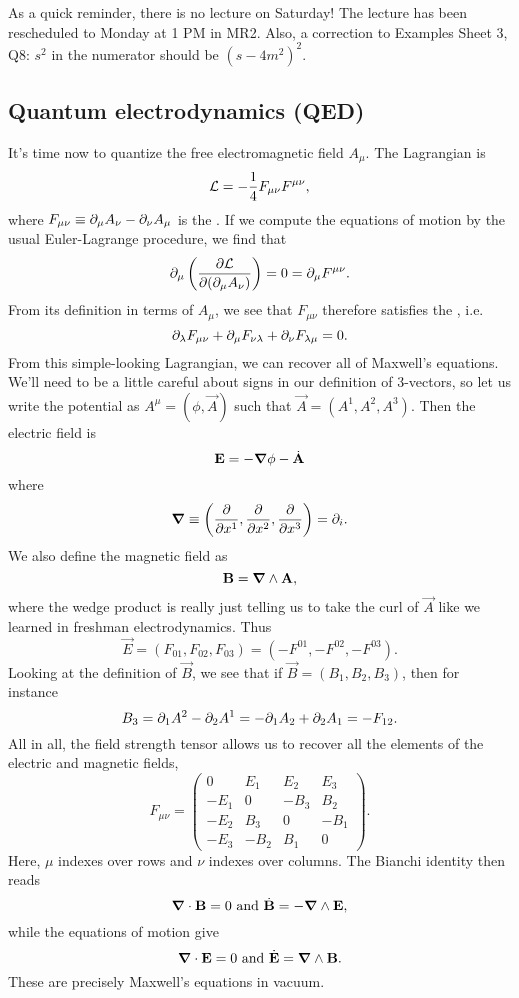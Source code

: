 As a quick reminder, there is no lecture on Saturday! The lecture has been rescheduled to Monday at 1 PM in MR2. Also, a correction to Examples Sheet 3, Q8: $s^2$ in the numerator should be $(s-4m^2)^2$.

\subsection*{Quantum electrodynamics (QED)} It's time now to quantize the free electromagnetic field $A_\mu$. The Lagrangian is
\begin{equation}
\mathcal L=-\frac{1}{4}F_{\mu\nu}F^{\mu\nu},
\end{equation}
where $F_{\mu\nu}\equiv \partial_\mu A_\nu -\partial_\nu A_\mu$ is the . If we compute the equations of motion by the usual Euler-Lagrange procedure, we find that
$$\partial_\mu\left(\frac{\partial \mathcal L}{\partial (\partial_\mu A_\nu)}\right)=0=\partial_\mu F^{\mu\nu}.$$
From its definition in terms of $A_\mu$, we see that $F_{\mu\nu}$ therefore satisfies the , i.e.
\begin{equation}
    \partial_\lambda F_{\mu\nu}+\partial_\mu F_{\nu\lambda}+\partial_\nu F_{\lambda\mu}=0.
\end{equation}
From this simple-looking Lagrangian, we can recover all of Maxwell's equations. We'll need to be a little careful about signs in our definition of 3-vectors, so let us write the potential as
$A^\mu=(\phi,\vec A)$ such that $\vec A=(A^1,A^2,A^3).$
Then the electric field is
$$\boldsymbol{\mathbf{E}}=-\mbox{\boldmath$ \nabla $} \phi - \dot {\boldsymbol{\mathbf{A}}}$$
where $$\mbox{\boldmath$ \nabla $} \equiv\left(\frac{\partial }{\partial x^1},\frac{\partial }{\partial x^2},\frac{\partial }{\partial x^3}\right)=\partial_i.$$
We also define the magnetic field as
$$\boldsymbol{\mathbf{B}}= \mbox{\boldmath$ \nabla $} \wedge \boldsymbol{\mathbf{A}},$$
where the wedge product is really just telling us to take the curl of $\vec A$ like we learned in freshman electrodynamics.
Thus
$$\vec E=(F_{01},F_{02},F_{03})=(-F^{01},-F^{02},-F^{03}).$$
Looking at the definition of $\vec B$, we see that if $\vec B=(B_1,B_2,B_3)$, then for instance
$$B_3=\partial_1 A^2-\partial_2 A^1 =-\partial_1 A_2+\partial_2 A_1 =-F_{12}.$$
All in all, the field strength tensor allows us to recover all the elements of the electric and magnetic fields,
$$F_{\mu\nu}=\begin{pmatrix}
0&E_1&E_2&E_3\\-E_1&0&-B_3&B_2\\
-E_2&B_3&0&-B_1\\
-E_3&-B_2&B_1&0
\end{pmatrix}.$$
Here, $\mu$ indexes over rows and $\nu$ indexes over columns.
The Bianchi identity then reads
$$\mbox{\boldmath$ \nabla $} \cdot \boldsymbol{\mathbf{B}}=0\text{ and }\dot {\boldsymbol{\mathbf{B}}}=-\mbox{\boldmath$ \nabla $} \wedge \boldsymbol{\mathbf{E}},$$
while the equations of motion give
$$\mbox{\boldmath$ \nabla $} \cdot \boldsymbol{\mathbf{E}}=0 \text{ and }\dot {\boldsymbol{\mathbf{E}}}=\mbox{\boldmath$ \nabla $} \wedge \boldsymbol{\mathbf{B}}.$$
These are precisely Maxwell's equations in vacuum.

